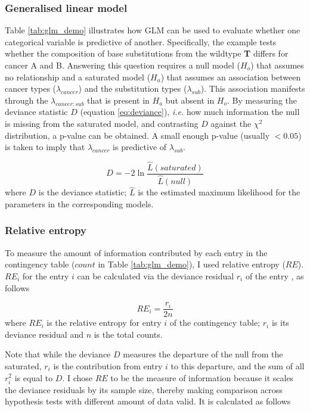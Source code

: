\subsubsection{Generalised linear model}
Table \ref{tab:glm_demo} illustrates how GLM can be used to evaluate whether one categorical variable is predictive of another. Specifically, the example tests whether the composition of base substitutions from the wildtype \textbf{T} differs for cancer A and B. Answering this question requires a null model ($H_o$) that assumes no relationship and a saturated model ($H_a$) that assumes an association between cancer types ($\lambda_{cancer}$) and the substitution types ($\lambda_{sub}$). This association manifests through the $\lambda_{cancer:sub}$ that is present in $H_a$ but absent in $H_o$. By measuring the deviance statistic $D$ (equation \ref{eq:deviance}), \textit{i.e.} how much information the null is missing from the saturated model, and contrasting $D$ against the $\chi^2$ distribution, a p-value can be obtained. A small enough p-value (usually $<0.05$) is taken to imply that $\lambda_{cancer}$ is predictive of $\lambda_{sub}$.

\begin{equation}
D = -2 \ln \frac{\hat{L}(saturated)}{\hat{L}(null)}
\label{eq:deviance}
\end{equation}
where $D$ is the deviance statistic; $\hat{L}$ is the estimated maximum likelihood for the parameters in the corresponding models.



\subsubsection{Relative entropy}\label{methods:re}
To measure the amount of information contributed by each entry in the contingency table ($count$ in Table \ref{tab:glm_demo}), I used relative entropy ($RE$). $RE_i$ for the entry $i$ can be calculated via the deviance residual $r_i$ of the entry \citep[$r_i$ obtained using appendix equation \ref{eq:dev_res};][]{Zhu2017}, as follows

\begin{equation}
    RE_i = \frac{r_i}{2n} 
    \label{eq:re}
\end{equation}
where $RE_i$ is the relative entropy for entry $i$ of the contingency table; $r_i$ is its deviance residual and $n$ is the total counts. 

Note that while the deviance $D$ measures the departure of the null from the saturated, $r_i$ is the contribution from entry $i$ to this departure, and the sum of all $r_i^2$ is equal to $D$. I chose $RE$ to be the measure of information because it scales the deviance residuals by its sample size, thereby making comparison across hypothesis tests with different amount of data valid. It is calculated as follows

